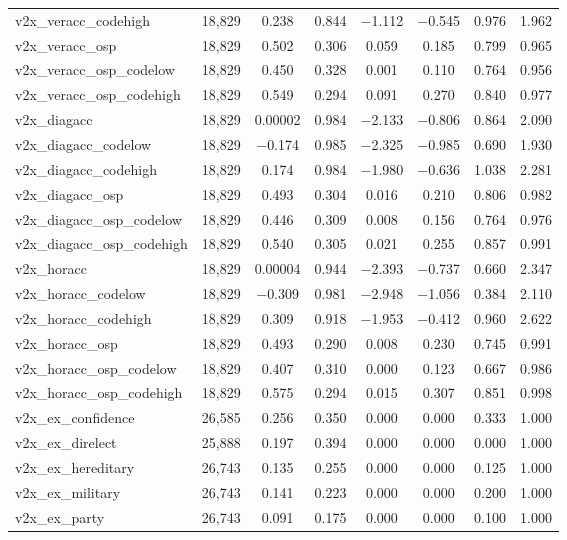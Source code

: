 \begin{table}[!htbp]
\begin{tabular}{@{\extracolsep{5pt}}lccccccc}
v2x\_veracc\_codehigh & 18,829 & 0.238 & 0.844 & $-$1.112 & $-$0.545 & 0.976 & 1.962 \\ 
v2x\_veracc\_osp & 18,829 & 0.502 & 0.306 & 0.059 & 0.185 & 0.799 & 0.965 \\ 
v2x\_veracc\_osp\_codelow & 18,829 & 0.450 & 0.328 & 0.001 & 0.110 & 0.764 & 0.956 \\ 
v2x\_veracc\_osp\_codehigh & 18,829 & 0.549 & 0.294 & 0.091 & 0.270 & 0.840 & 0.977 \\ 
v2x\_diagacc & 18,829 & 0.00002 & 0.984 & $-$2.133 & $-$0.806 & 0.864 & 2.090 \\ 
v2x\_diagacc\_codelow & 18,829 & $-$0.174 & 0.985 & $-$2.325 & $-$0.985 & 0.690 & 1.930 \\ 
v2x\_diagacc\_codehigh & 18,829 & 0.174 & 0.984 & $-$1.980 & $-$0.636 & 1.038 & 2.281 \\ 
v2x\_diagacc\_osp & 18,829 & 0.493 & 0.304 & 0.016 & 0.210 & 0.806 & 0.982 \\ 
v2x\_diagacc\_osp\_codelow & 18,829 & 0.446 & 0.309 & 0.008 & 0.156 & 0.764 & 0.976 \\ 
v2x\_diagacc\_osp\_codehigh & 18,829 & 0.540 & 0.305 & 0.021 & 0.255 & 0.857 & 0.991 \\ 
v2x\_horacc & 18,829 & 0.00004 & 0.944 & $-$2.393 & $-$0.737 & 0.660 & 2.347 \\ 
v2x\_horacc\_codelow & 18,829 & $-$0.309 & 0.981 & $-$2.948 & $-$1.056 & 0.384 & 2.110 \\ 
v2x\_horacc\_codehigh & 18,829 & 0.309 & 0.918 & $-$1.953 & $-$0.412 & 0.960 & 2.622 \\ 
v2x\_horacc\_osp & 18,829 & 0.493 & 0.290 & 0.008 & 0.230 & 0.745 & 0.991 \\ 
v2x\_horacc\_osp\_codelow & 18,829 & 0.407 & 0.310 & 0.000 & 0.123 & 0.667 & 0.986 \\ 
v2x\_horacc\_osp\_codehigh & 18,829 & 0.575 & 0.294 & 0.015 & 0.307 & 0.851 & 0.998 \\ 
v2x\_ex\_confidence & 26,585 & 0.256 & 0.350 & 0.000 & 0.000 & 0.333 & 1.000 \\ 
v2x\_ex\_direlect & 25,888 & 0.197 & 0.394 & 0.000 & 0.000 & 0.000 & 1.000 \\ 
v2x\_ex\_hereditary & 26,743 & 0.135 & 0.255 & 0.000 & 0.000 & 0.125 & 1.000 \\ 
v2x\_ex\_military & 26,743 & 0.141 & 0.223 & 0.000 & 0.000 & 0.200 & 1.000 \\ 
v2x\_ex\_party & 26,743 & 0.091 & 0.175 & 0.000 & 0.000 & 0.100 & 1.000 \\ 

\end{tabular}
\end{table}
